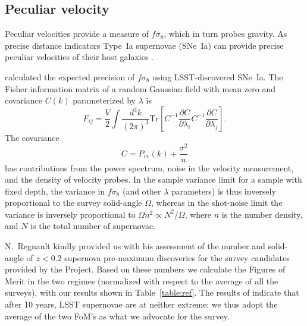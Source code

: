 \subsection{Peculiar velocity}

Peculiar velocities provide a measure of $f\sigma_8$, which in turn probes gravity.  As precise distance indicators Type~Ia supernovae (SNe~Ia)
can provide precise peculiar velocities of their host galaxies \citep{2006PhRvD..73l3526H,2011ApJ...741...67D}.

\citet{2017ApJ...847..128H} calculated the  expected precision of $f\sigma_8$ using LSST-discovered SNe~Ia.
The Fisher information matrix of a random Gaussian field with mean zero and covariance $C(k)$ parameterized by $\lambda$ is
\begin{equation}
F_{ij} = \frac{V}{2}\int \frac{d^3k}{(2\pi)^3} \text{Tr}\left[ C^{-1} \frac{\partial C}{\partial \lambda_i} C^{-1}
\frac{\partial C}{\partial \lambda_j} \right].
\end{equation}
The covariance
\begin{equation}
C = P_{vv}(k) + \frac{\sigma^2}{n}
\end{equation}
has contributions from the power spectrum, noise in the velocity measurement, and the density of velocity probes.
In the sample variance limit for a sample with fixed depth, the variance in $f\sigma_8$ (and other $\lambda$ parameters)
is thus inversely proportional to the survey solid-angle $\Omega$, whereas
in the shot-noise limit the variance is inversely proportional to $\Omega n^2 \propto N^2/\Omega$, where $n$ is the number density,
and $N$ is the total number of supernovae.  


N.~Regnault kindly provided us with his assessment of the number and solid-angle of $z<0.2$ supernova pre-maximum discoveries 
for the survey candidates provided by the Project.  Based on these numbers we calculate the Figures of Merit in the two regimes 
(normalized with respect to the average of all the surveys),
with our results shown in 
Table~\ref{table:ref}.  The results of \citet{2017ApJ...847..128H}  indicate that after 10 years,
LSST supernovae are at neither extreme; we thus adopt the average of the two FoM's as what we advocate for the survey.


